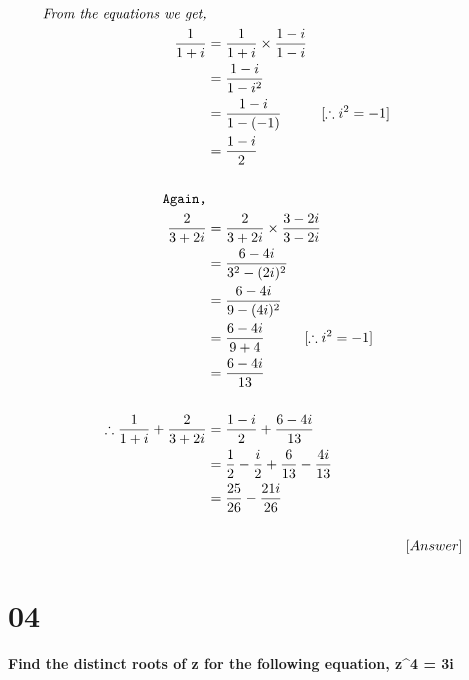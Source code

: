 \documentclass[12pt]{article}
\begin{document}
\begin{align*}
    \textit{From the equations we get,}
    \\
    \frac{1}{1+i} &= \frac{1}{1+i} \times \frac{1-i}{1-i}
    \\
    &= \frac{1-i}{1-i^2}
    \\
    &= \frac{1-i}{1-(-1)} \hspace{10mm}[\therefore i^2 = -1]
    \\
    &= \frac{1-i}{2}
    \\
    \\
    \texttt{Again,}
    \\
    \frac{2}{3+2i} &= \frac{2}{3+2i} \times \frac{3-2i}{3-2i}
    \\
    &= \frac{6-4i}{3^2 - (2i)^2}
    \\
    &= \frac{6-4i}{9-(4i)^2}
    \\
    &= \frac{6-4i}{9+4} \hspace{10mm}[\therefore i^2=-1]
    \\
    &= \frac{6-4i}{13}
    \\ \\
    \therefore \frac{1}{1+i} + \frac{2}{3+2i} &= \frac{1-i}{2} + \frac{6-4i}{13}
    \\
    &= \frac{1}{2} - \frac{i}{2} + \frac{6}{13} - \frac{4i}{13}
    \\
    &= \frac{25}{26} - \frac{21i}{26}
    \\ \\
    &\hspace{50mm}[Answer]
\end{align*}
\newpage


                

\chapter{04}
\textbf{Find the distinct roots of z for the following equation, z^4 = 3i}
\end{document}
